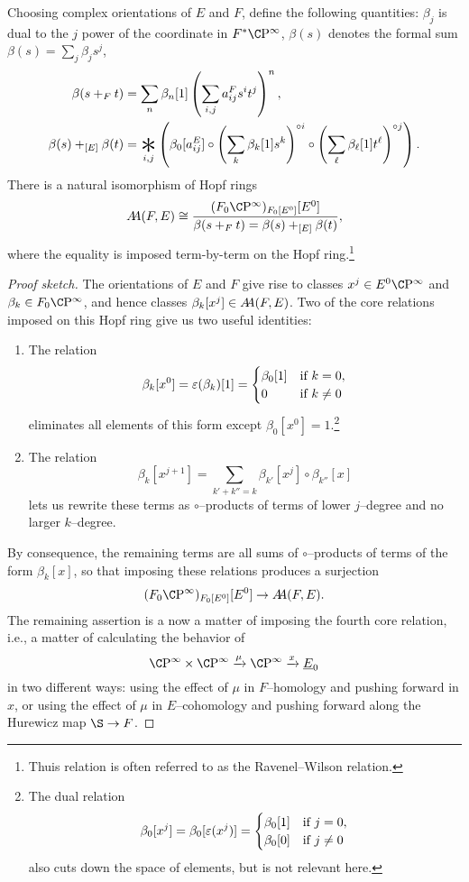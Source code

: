 \begin{lemma}\label{UnstableRWRelation}
Choosing complex orientations of \(E\) and \(F\), define the following quantities: \(\beta_j\) is dual to the \(j\){\th} power of the coordinate in \(F^* \CP^\infty\), \(\beta(s)\) denotes the formal sum \(\beta(s) = \sum_j \beta_j s^j\),
\begin{align*}
\beta(s +_F t) & = \sum_n \beta_n[1] \left(\sum_{i, j} a_{ij}^F s^i t^j \right)^n, \\
\beta(s) +_{[E]} \beta(t) & = \bigast_{i, j} \left(\beta_0[a_{ij}^E] \circ \left( \sum_k \beta_k[1] s^k \right)^{\circ i} \circ \left( \sum_\ell \beta_\ell[1] t^\ell \right)^{\circ j} \right).
\end{align*}
There is a natural isomorphism of Hopf rings \[\AA(F, E) \cong \frac{(F_0 \CP^\infty)_{F_0[E^0]}[E^0]}{\beta(s +_F t) = \beta(s) +_{[E]} \beta(t)},\] where the equality is imposed term-by-term on the Hopf ring.\footnote{Thuis relation is often referred to as the Ravenel--Wilson relation.}
\end{lemma}
\begin{proof}[Proof sketch]
The orientations of \(E\) and \(F\) give rise to classes \(x^j \in E^0 \CP^\infty\) and \(\beta_k \in F_0 \CP^\infty\), and hence classes \(\beta_k[x^j] \in \AA(F, E)\).  Two of the core relations imposed on this Hopf ring give us two useful identities:
\begin{enumerate}
    \item The relation \[\beta_k[x^0] = \eps(\beta_k)[1] = \begin{cases} \beta_0[1] & \text{if \(k = 0\)}, \\ 0 & \text{if \(k \ne 0\)}\end{cases}\] eliminates all elements of this form except \(\beta_0[x^0] = 1\).\footnote{The dual relation \[\beta_0[x^j] = \beta_0[\eps(x^j)] = \begin{cases} \beta_0[1] & \text{if \(j = 0\)}, \\ \beta_0[0] & \text{if \(j \ne 0\)}\end{cases}\] also cuts down the space of elements, but is not relevant here.}
    \item The relation \[\beta_k[x^{j+1}] = \sum_{k' + k'' = k} \beta_{k'}[x^j] \circ \beta_{k''}[x]\] lets us rewrite these terms as \(\circ\)--products of terms of lower \(j\)--degree and no larger \(k\)--degree.
\end{enumerate}
By consequence, the remaining terms are all sums of \(\circ\)--products of terms of the form \(\beta_k[x]\), so that imposing these relations produces a surjection \[(F_0 \CP^\infty)_{F_0[E^0]}[E^0] \to \AA(F, E).\]  The remaining assertion is a now a matter of imposing the fourth core relation, i.e., a matter of calculating the behavior of \[\CP^\infty \times \CP^\infty \xrightarrow{\mu} \CP^\infty \xrightarrow{x} \OS{E}{0}\] in two different ways: using the effect of \(\mu\) in \(F\)--homology and pushing forward in \(x\), or using the effect of \(\mu\) in \(E\)--cohomology and pushing forward along the Hurewicz map \(\S \to F\).
\end{proof}



